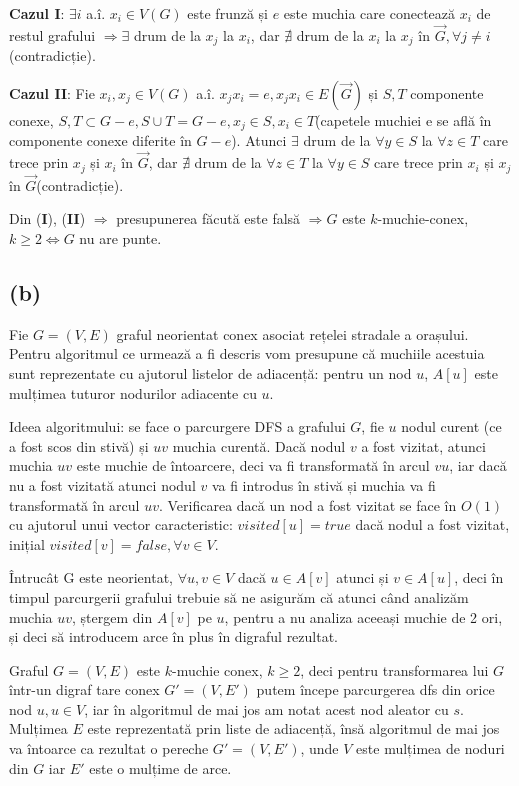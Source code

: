 \documentclass[a4paper,12pt]{article}
\begin{document}
\textbf{Cazul I}: $\exists i$ a.î. $x_i \in V(G)$ este frunză și $e$ este muchia care conectează $x_i$ de restul grafului $\Rightarrow \exists$ drum de la $x_j$ la $x_i$, dar $\nexists$ drum de la $x_i$ la $x_j$ în $\overrightarrow{G}, \forall j\neq i$(contradicție).

\textbf{Cazul II}: Fie $x_i,x_j \in V(G)$ a.î. $x_jx_i = e, x_jx_i \in E(\overrightarrow{G})$ și $S,T$ componente conexe, $S,T \subset G-e, S\cup T=G-e, x_j \in S, x_i \in T$(capetele muchiei e se află în componente conexe diferite în $G-e$). Atunci $\exists$ drum de la $\forall y \in S$ la $\forall z \in T$ care trece prin $x_j$ și $x_i$ în $\overrightarrow{G}$, dar $\nexists$ drum de la $\forall z \in T$ la $\forall y \in S$ care trece prin $x_i$ și $x_j$ în $\overrightarrow{G}$(contradicție).

Din (\textbf{I}), (\textbf{II}) $\Rightarrow$ presupunerea făcută este falsă $\Rightarrow G$ este $k$-muchie-conex,\linebreak $k\geq2 \Leftrightarrow G$ nu are punte. 

\subsection{(b)}

Fie $G=(V,E)$ graful neorientat conex asociat rețelei stradale a orașului. Pentru algoritmul ce urmează a fi descris vom presupune că muchiile acestuia sunt reprezentate cu ajutorul listelor de adiacență: pentru un nod $u$, $A[u]$ este mulțimea tuturor nodurilor adiacente cu $u$. 

Ideea algoritmului: se face o parcurgere DFS a grafului $G$, fie $u$ nodul curent (ce a fost scos din stivă) și $uv$ muchia curentă. Dacă nodul $v$ a fost vizitat, atunci muchia $uv$ este muchie de întoarcere, deci va fi transformată în arcul $vu$, iar dacă nu a fost vizitată atunci nodul $v$ va fi introdus în stivă și muchia va fi transformată în arcul $uv$. Verificarea dacă un nod a fost vizitat se face în $O(1)$ cu ajutorul unui vector caracteristic: $visited[u] = true$ dacă nodul a fost vizitat,  inițial $visited[v] = false, \forall v \in V$. 

Întrucât G este neorientat, $\forall u,v \in V$ dacă $u \in A[v]$ atunci și $v \in A[u]$, deci în timpul parcurgerii grafului trebuie să ne asigurăm că atunci când analizăm muchia $uv$, ștergem din $A[v]$ pe $u$, pentru a nu analiza aceeași muchie de 2 ori, și deci să introducem arce în plus în digraful rezultat.

Graful $G=(V,E)$ este $k$-muchie conex, $k \geq 2$, deci pentru transformarea lui $G$ într-un digraf tare conex $G'=(V,E')$ putem începe parcurgerea dfs din orice nod $u, u \in V$, iar în algoritmul de mai jos am notat acest nod aleator cu $s$. Mulțimea $E$ este reprezentată  prin liste de adiacență, însă algoritmul de mai jos va întoarce ca rezultat o pereche $G'=(V,E')$, unde $V$ este mulțimea de noduri din $G$ iar $E'$ este o mulțime de arce.
\end{document}
